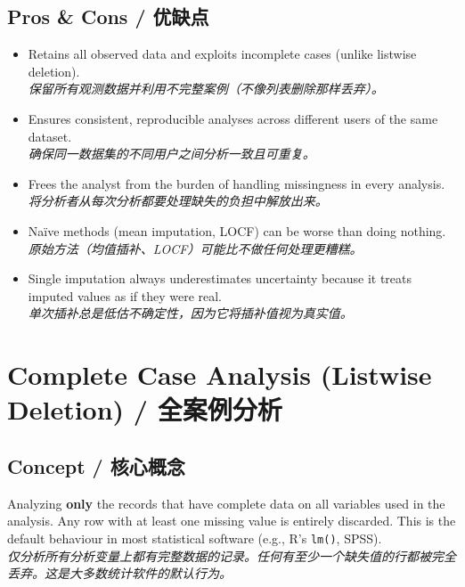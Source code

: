 \documentclass[9pt, a4paper]{article}
\begin{document}
\subsection{Pros \& Cons / 优缺点}
\begin{tcolorbox}[prosbox]
    \begin{itemize}
        \item [\ding{51}] Retains all observed data and exploits incomplete cases (unlike listwise deletion).\\
        \textit{保留所有观测数据并利用不完整案例（不像列表删除那样丢弃）。}
        \item [\ding{51}] Ensures consistent, reproducible analyses across different users of the same dataset.\\
        \textit{确保同一数据集的不同用户之间分析一致且可重复。}
        \item [\ding{51}] Frees the analyst from the burden of handling missingness in every analysis.\\
        \textit{将分析者从每次分析都要处理缺失的负担中解放出来。}
    \end{itemize}
\end{tcolorbox}
\begin{tcolorbox}[consbox]
    \begin{itemize}
        \item [\ding{55}] Naïve methods (mean imputation, LOCF) can be worse than doing nothing.\\
        \textit{原始方法（均值插补、LOCF）可能比不做任何处理更糟糕。}
        \item [\ding{55}] Single imputation always underestimates uncertainty because it treats imputed values as if they were real.\\
        \textit{单次插补总是低估不确定性，因为它将插补值视为真实值。}
    \end{itemize}
\end{tcolorbox}

\section{Complete Case Analysis (Listwise Deletion) / 全案例分析}

\subsection{Concept / 核心概念}
\begin{tcolorbox}[defbox]
    Analyzing \textbf{only} the records that have complete data on all variables used in the analysis. Any row with at least one missing value is entirely discarded. This is the default behaviour in most statistical software (e.g., R's \texttt{lm()}, SPSS).\\
    \textit{仅分析所有分析变量上都有完整数据的记录。任何有至少一个缺失值的行都被完全丢弃。这是大多数统计软件的默认行为。}
\end{tcolorbox}
\end{document}

